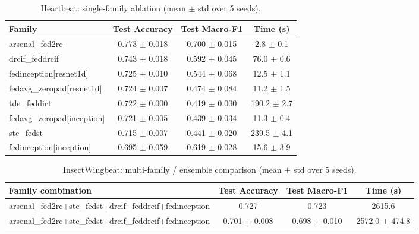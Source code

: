 \begin{table}[t]
\centering
\caption{Heartbeat: single-family ablation (mean $\pm$ std over 5 seeds).}
\label{tab:results_heartbeat_ablation}
\begin{tabular}{lccc}
\toprule
Family & Test Accuracy & Test Macro-F1 & Time (s) \\
\midrule
arsenal\_fed2rc & 0.773 $\pm$ 0.018 & 0.700 $\pm$ 0.015 & 2.8 $\pm$ 0.1 \\
drcif\_feddrcif & 0.743 $\pm$ 0.018 & 0.592 $\pm$ 0.045 & 76.0 $\pm$ 0.6 \\
fedinception[resnet1d] & 0.725 $\pm$ 0.010 & 0.544 $\pm$ 0.068 & 12.5 $\pm$ 1.1 \\
fedavg\_zeropad[resnet1d] & 0.724 $\pm$ 0.007 & 0.474 $\pm$ 0.084 & 11.2 $\pm$ 1.5 \\
tde\_feddict & 0.722 $\pm$ 0.000 & 0.419 $\pm$ 0.000 & 190.2 $\pm$ 2.7 \\
fedavg\_zeropad[inception] & 0.721 $\pm$ 0.005 & 0.439 $\pm$ 0.034 & 11.3 $\pm$ 0.4 \\
stc\_fedst & 0.715 $\pm$ 0.007 & 0.441 $\pm$ 0.020 & 239.5 $\pm$ 4.1 \\
fedinception[inception] & 0.695 $\pm$ 0.059 & 0.619 $\pm$ 0.028 & 15.6 $\pm$ 3.9 \\
\bottomrule
\end{tabular}
\end{table}

\begin{table}[t]
\centering
\caption{InsectWingbeat: multi-family / ensemble comparison (mean $\pm$ std over 5 seeds).}
\label{tab:results_insectwingbeat_ensemble}
\begin{tabular}{lccc}
\toprule
Family combination & Test Accuracy & Test Macro-F1 & Time (s) \\
\midrule
arsenal\_fed2rc+stc\_fedst+drcif\_feddrcif+fedinception & 0.727 & 0.723 & 2615.6 \\
arsenal\_fed2rc+stc\_fedst+drcif\_feddrcif+fedinception & 0.701 $\pm$ 0.008 & 0.698 $\pm$ 0.010 & 2572.0 $\pm$ 474.8 \\
\bottomrule
\end{tabular}
\end{table}


